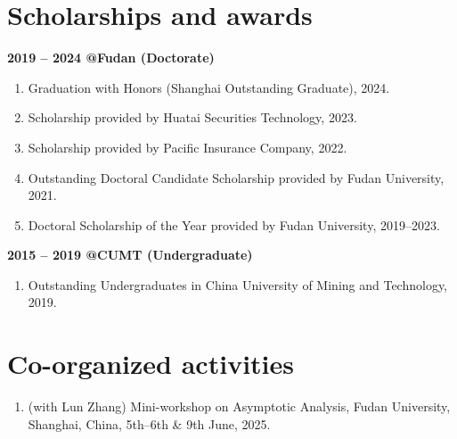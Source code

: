 \documentclass[margin]{res}
\begin{document}
\begin{resume}
\section{Scholarships and awards}
\textbf{2019 -- 2024 @Fudan (Doctorate)}
\begin{enumerate}[--]
    \item Graduation with Honors (Shanghai Outstanding Graduate), 2024.
    \item Scholarship provided by Huatai Securities Technology, 2023.
    \item Scholarship provided by Pacific Insurance Company, 2022. 
    \item Outstanding Doctoral Candidate Scholarship provided by Fudan University, 2021. 
    \item Doctoral Scholarship of the Year provided by Fudan University, 2019--2023. 
\end{enumerate}

\textbf{2015 -- 2019 @CUMT (Undergraduate)}
\begin{enumerate}[--]
    \item Outstanding Undergraduates in China University of Mining and Technology, 2019.
\end{enumerate}


\section{Co-organized activities}
\begin{enumerate}[--]
    \item (with Lun Zhang) Mini-workshop on Asymptotic Analysis, Fudan University, Shanghai, China, 5th--6th \& 9th June, 2025.
\end{enumerate}


\end{resume}
\end{document}
